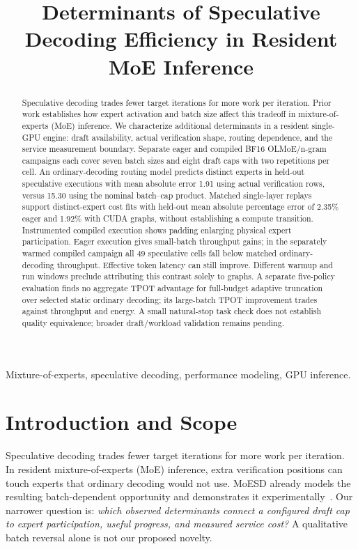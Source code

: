 \documentclass[conference,letterpaper]{IEEEtran}
\title{Determinants of Speculative Decoding Efficiency in Resident MoE Inference}
\author{\IEEEauthorblockN{Working research manuscript}
\IEEEauthorblockA{Author names and affiliations pending}}
\begin{document}
\maketitle
\begin{abstract}
Speculative decoding trades fewer target iterations for more work per iteration. Prior work establishes how expert activation and batch size affect this tradeoff in mixture-of-experts (MoE) inference. We characterize additional determinants in a resident single-GPU engine: draft availability, actual verification shape, routing dependence, and the service measurement boundary. Separate eager and compiled BF16 OLMoE/n-gram campaigns each cover seven batch sizes and eight draft caps with two repetitions per cell. An ordinary-decoding routing model predicts distinct experts in held-out speculative executions with mean absolute error 1.91 using actual verification rows, versus 15.30 using the nominal batch--cap product. Matched single-layer replays support distinct-expert cost fits with held-out mean absolute percentage error of 2.35\% eager and 1.92\% with CUDA graphs, without establishing a compute transition. Instrumented compiled execution shows padding enlarging physical expert participation. Eager execution gives small-batch throughput gains; in the separately warmed compiled campaign all 49 speculative cells fall below matched ordinary-decoding throughput. Effective token latency can still improve. Different warmup and run windows preclude attributing this contrast solely to graphs. A separate five-policy evaluation finds no aggregate TPOT advantage for full-budget adaptive truncation over selected static ordinary decoding; its large-batch TPOT improvement trades against throughput and energy. A small natural-stop task check does not establish quality equivalence; broader draft/workload validation remains pending.
\end{abstract}
\begin{IEEEkeywords}
Mixture-of-experts, speculative decoding, performance modeling, GPU inference.
\end{IEEEkeywords}

\section{Introduction and Scope}
Speculative decoding trades fewer target iterations for more work per iteration. In resident mixture-of-experts (MoE) inference, extra verification positions can touch experts that ordinary decoding would not use. MoESD already models the resulting batch-dependent opportunity and demonstrates it experimentally~\cite{moesd}. Our narrower question is: \emph{which observed determinants connect a configured draft cap to expert participation, useful progress, and measured service cost?} A qualitative batch reversal alone is not our proposed novelty.
\end{document}
